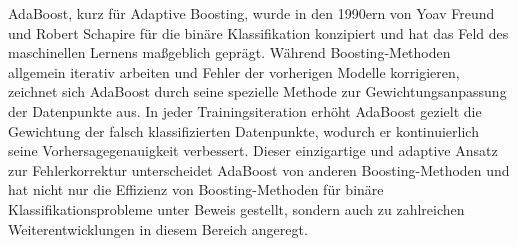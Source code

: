 AdaBoost, kurz für \glqq Adaptive Boosting\grqq, wurde in den 1990ern von Yoav Freund und Robert Schapire für die binäre
Klassifikation konzipiert und hat das Feld des maschinellen Lernens maßgeblich geprägt. Während Boosting-Methoden
allgemein iterativ arbeiten und Fehler der vorherigen Modelle korrigieren, zeichnet sich AdaBoost durch seine spezielle
Methode zur Gewichtungsanpassung der Datenpunkte aus. In jeder Trainingsiteration erhöht AdaBoost gezielt die Gewichtung
der falsch klassifizierten Datenpunkte, wodurch er kontinuierlich seine Vorhersagegenauigkeit verbessert. Dieser
einzigartige und adaptive Ansatz zur Fehlerkorrektur unterscheidet AdaBoost von anderen Boosting-Methoden und hat
nicht nur die Effizienz von Boosting-Methoden für binäre Klassifikationsprobleme unter Beweis gestellt, sondern auch zu
zahlreichen Weiterentwicklungen in diesem Bereich angeregt. \cite{WuKumar2009}
